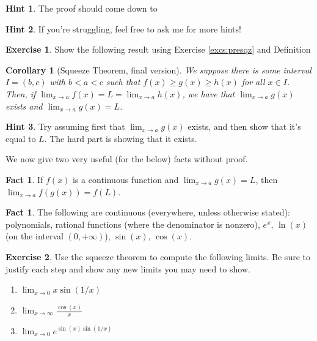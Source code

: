 \documentclass[english]{book}
\newtheorem{corollary}[theorem]{Corollary}
\theoremstyle{remark}
\theoremstyle{definition}
\newtheorem{excs}{Exercise}[chapter]
\newtheorem{hint}{Hint}[excs]
\newtheorem*{next week}{Next Week}
\newtheorem{fact}[theorem]{Fact}
\newcommand{\dlim}{\displaystyle\lim}
\begin{document}
\begin{hint}
The proof should come down to 
\end{hint}
\begin{hint}
	If you're struggling, feel free to ask me for more hints!
\end{hint}
\begin{excs}\label{excs:sqz}
	Show the following result using Exercise \ref{excs:presqz} and Definition
	\begin{corollary}[Squeeze Theorem, final version]\label{cor:finalsqz}
		We suppose there is some interval $I=(b,c)$ with $b<a<c$ such that $f(x)\geq g(x)\geq h(x)$ for all $x\in I$. Then, if $\lim_{x\to a}f(x)=L=\lim_{x\to a}h(x)$, we have that $\lim_{x\to a}g(x)$ exists and $\lim_{x\to a}g(x)=L$.
	\end{corollary}
\begin{hint}
Try assuming first that $\lim_{x\to a}g(x)$ exists, and then show that it's equal to $L$. The hard part is showing that it exists.
\end{hint}\end{excs}
We now give two very useful (for the below) facts without proof.
\begin{fact}
	If $f(x)$ is a continuous function and $\dlim_{x\to a}g(x)=L$, then $\dlim_{x\to a}f(g(x))=f(L)$.
\end{fact}
\begin{fact}
	The following are continuous (everywhere, unless otherwise stated): polynomials, rational functions (where the denominator is nonzero), $e^x$, $\ln(x)$ (on the interval $(0,+\infty)$), $\sin(x)$, $\cos(x)$. 
\end{fact}
\begin{excs}
	Use the squeeze theorem to compute the following limits. Be sure to justify each step and show any new limits you may need to show. \begin{enumerate}[label=\textit{(\alph*)}]
		\item $\dlim_{x\to 0}{x\sin(1/x)}$
		\item $\dlim_{x\to \infty} \frac{\cos(x)}{x}$
		\item $\dlim_{x\to 0} e^{\sin(x)\sin(1/x)}$
		
	\end{enumerate}
\end{excs}
\end{document}
